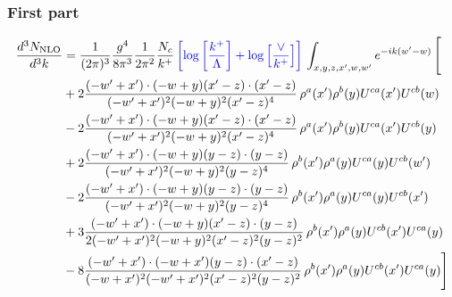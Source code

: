 \documentclass[aps,prd,amsmath,amssymb,nofootinbib]{revtex4-2}
\numberwithin{equation}{section}
\begin{document}
\subsubsection{First part}
\begin{align}
    \frac{d^{3}N_{\rm NLO}}{d^{3}k} & = \frac{1}{(2\pi)^{3}}\frac{g^{4}}{8\pi^{3}}\frac{1}{2\pi^{2}} \frac{N_{c}}{k^{+}}\,{\color{blue}\left[\log{\left[\frac{k^{+}}{\Lambda}\right]}+\log{\left[\frac{\vee}{k^{+}}\right]}\right]}\,\int_{x,y,z,x^{\prime},w,w^{\prime}}e^{-ik(w^{\prime}-w)}\, \Bigg[\notag \\ &  + 2 \frac{( - w' + x') \cdot ( - w + y) (x' - z) \cdot (x' - z)}{( - w' + x')^{2} ( - w + y)^{2} (x' - z)^{4}}\,\rho^{a}(x') \rho^{b}(y) U^{c a}(x') U^{c b}(w)\nonumber\\
    &- 2 \frac{( - w' + x') \cdot ( - w + y) (x' - z) \cdot (x' - z)}{( - w' + x')^{2} ( - w + y)^{2} (x' - z)^{4}}\,\rho^{a}(x') \rho^{b}(y) U^{c a}(x') U^{c b}(y)\nonumber\\
        &+ 2 \frac{( - w' + x') \cdot ( - w + y) (y - z) \cdot (y - z)}{( - w' + x')^{2} ( - w + y)^{2} (y - z)^{4}}\,\rho^{b}(x') \rho^{a}(y) U^{c a}(y) U^{c b}(w')\nonumber\\
    &-2\frac{( - w' + x') \cdot ( - w + y) (y - z) \cdot (y - z)}{( - w' + x')^{2} ( - w + y)^{2} (y - z)^{4}}\,\rho^{b}(x') \rho^{a}(y) U^{c a}(y) U^{c b}(x')\nonumber\\
    &+ 3 \frac{( - w' + x') \cdot ( - w + y) (x' - z) \cdot (y - z)}{2 ( - w' + x')^{2} ( - w + y)^{2} (x' - z)^{2} (y - z)^{2}}\,\rho^{b}(x') \rho^{a}(y) U^{cb}(x') U^{ca}(y) \nonumber\\
    &- 8 \frac{( - w' + x') \cdot ( - w + x') (y - z) \cdot (x' - z)}{( - w + x')^{2} ( - w' + x')^{2} (x' - z)^{2} (y - z)^{2}}\,\rho^{b}(x') \rho^{a}(y) U^{cb}(x') U^{c a}(y) \Bigg]
\end{align}
\end{document}
